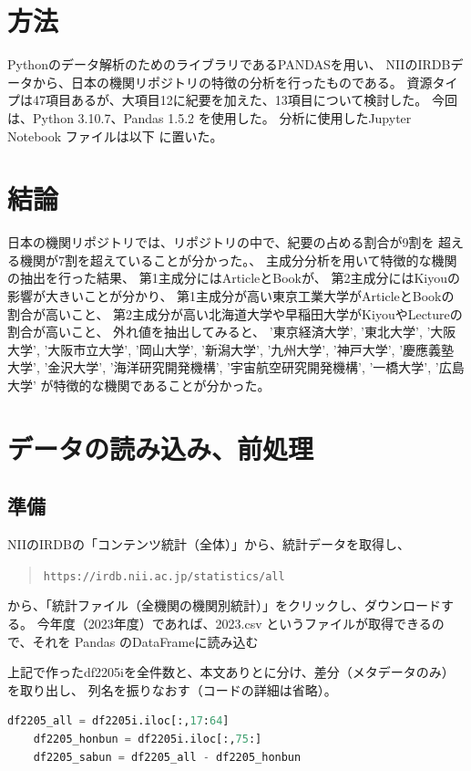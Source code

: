 \documentclass[submit,noauthor]{ono}
\def\|{\verb|}
\begin{document}

%2
\section{方法}
Pythonのデータ解析のためのライブラリであるPANDASを用い、
NIIのIRDBデータから、日本の機関リポジトリの特徴の分析を行ったものである。
資源タイプは47項目あるが、大項目12に紀要を加えた、13項目について検討した。
今回は、Python 3.10.7、Pandas 1.5.2 を使用した。
分析に使用したJupyter Notebook ファイルは以下
に置いた。

%3
\section{結論}
日本の機関リポジトリでは、リポジトリの中で、紀要の占める割合が9割を
超える機関が7割を超えていることが分かった。、
主成分分析を用いて特徴的な機関の抽出を行った結果、
第1主成分にはArticleとBookが、
第2主成分にはKiyouの影響が大きいことが分かり、
第1主成分が高い東京工業大学がArticleとBookの割合が高いこと、
第2主成分が高い北海道大学や早稲田大学がKiyouやLectureの割合が高いこと、
外れ値を抽出してみると、
'東京経済大学', '東北大学', '大阪大学', '大阪市立大学', '岡山大学', '新潟大学', '九州大学', '神戸大学', '慶應義塾大学', '金沢大学', '海洋研究開発機構', '宇宙航空研究開発機構', '一橋大学', '広島大学'
が特徴的な機関であることが分かった。

%4
\section{データの読み込み、前処理}
%4.1
\subsection{準備}

NIIのIRDBの「コンテンツ統計（全体）」から、統計データを取得し、
\begin{quote}
	\small
	\|https://irdb.nii.ac.jp/statistics/all|
\end{quote}
から、「統計ファイル（全機関の機関別統計）」をクリックし、ダウンロードする。
今年度（2023年度）であれば、2023.csv というファイルが取得できるので、それを
Pandas のDataFrameに読み込む

上記で作ったdf2205iを全件数と、本文ありとに分け、差分（メタデータのみ）を取り出し、
列名を振りなおす（コードの詳細は省略）。

\begin{lstlisting}[language=Python,breaklines,caption=hoge,label=df2205_all]
	df2205_all = df2205i.iloc[:,17:64]
	df2205_honbun = df2205i.iloc[:,75:]
	df2205_sabun = df2205_all - df2205_honbun
\end{lstlisting}
\end{document}
